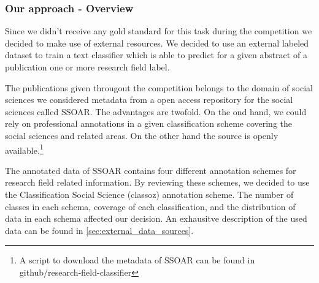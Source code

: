 \subsubsection{Our approach - Overview}
Since we didn't receive any gold standard for this task during the competition we decided to make use of external resources.
We decided to use an external labeled dataset to train a text classifier which is able to predict for a given abstract of a publication one or more research field label.

The publications given througout the competition belongs to the domain of social sciences we considered metadata from a open access repository for the social sciences called SSOAR.
The advantages are twofold.
On the ond hand, we could rely on professional annotations in a given classification scheme covering the social sciences and related areas.
On the other hand the source is openly available.\footnote{A script to download the metadata of SSOAR can be found in github/research-field-classifier}

The annotated data of SSOAR contains four different annotation schemes for research field related information. By reviewing these schemes, we decided to use the Classification Social Science (classoz) annotation scheme. The number of classes in each schema, coverage of each classification, and the distribution of data in each schema affected our decision. 
An exhausitve description of the used data can be found in \ref{sec:external_data_sources}.

